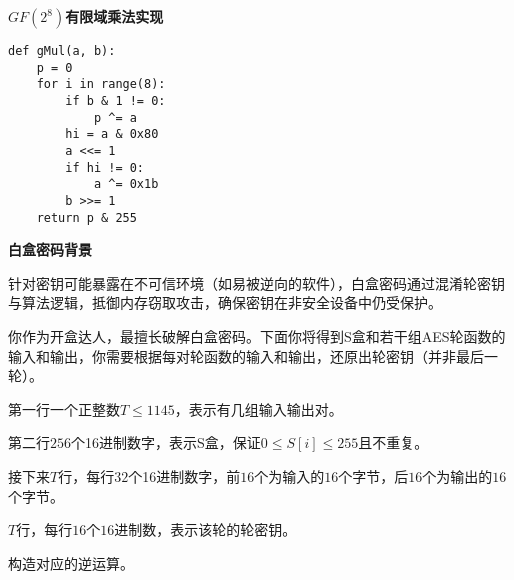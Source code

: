 \textbf{$GF(2^8)$有限域乘法实现}

\begin{verbatim}
def gMul(a, b):
    p = 0
    for i in range(8):
        if b & 1 != 0:
            p ^= a
        hi = a & 0x80
        a <<= 1
        if hi != 0:
            a ^= 0x1b
        b >>= 1
    return p & 255
\end{verbatim}

\textbf{白盒密码背景}

针对密钥可能暴露在不可信环境（如易被逆向的软件），白盒密码通过混淆轮密钥与算法逻辑，抵御内存窃取攻击，确保密钥在非安全设备中仍受保护。

你作为开盒达人，最擅长破解白盒密码。下面你将得到S盒和若干组AES轮函数的输入和输出，你需要根据每对轮函数的输入和输出，还原出轮密钥（并非最后一轮）。


第一行一个正整数$T\leqslant 1145$，表示有几组输入输出对。

第二行$256$个16进制数字，表示S盒，保证$0\leqslant S[i]\leqslant 255$且不重复。

接下来$T$行，每行$32$个16进制数字，前$16$个为输入的$16$个字节，后$16$个为输出的$16$个字节。


$T$行，每行$16$个$16$进制数，表示该轮的轮密钥。



构造对应的逆运算。
